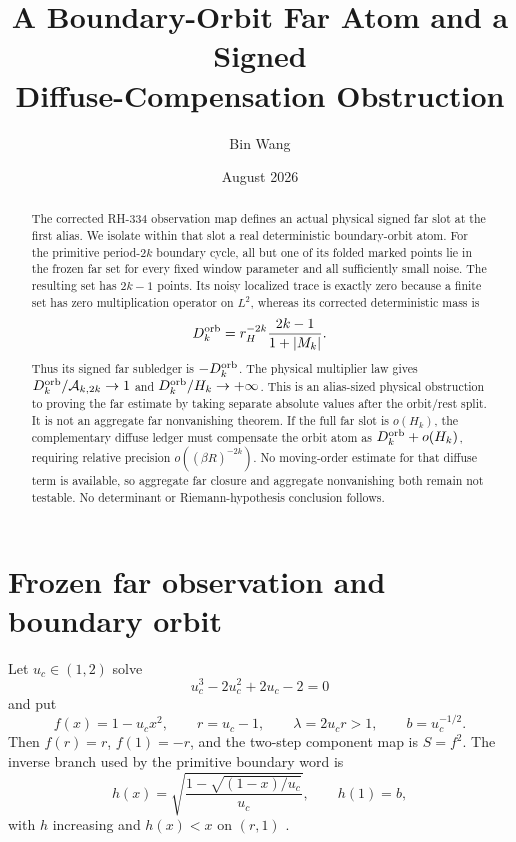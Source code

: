 \documentclass[11pt]{article}
\title{A Boundary-Orbit Far Atom and a Signed\\
Diffuse-Compensation Obstruction}
\author{Bin Wang}
\date{August 2026}
\theoremstyle{remark}
\begin{document}
\maketitle

\begin{abstract}
The corrected RH-334 observation map defines an actual physical signed far
slot at the first alias.  We isolate within that slot a real deterministic
boundary-orbit atom.  For the primitive period-$2k$ boundary cycle, all but
one of its folded marked points lie in the frozen far set for every fixed
window parameter and all sufficiently small noise.  The resulting set has
$2k-1$ points.  Its noisy localized trace is exactly zero because a finite
set has zero multiplication operator on $L^2$, whereas its corrected
deterministic mass is
\[
 D_k^{\rm orb}=r_H^{-2k}\frac{2k-1}{1+|M_k|}.
\]
Thus its signed far subledger is $-D_k^{\rm orb}$.  The physical multiplier
law gives $D_k^{\rm orb}/\mathcal A_{k,2k}\to1$ and
$D_k^{\rm orb}/H_k\to+\infty$.  This is an alias-sized physical obstruction
to proving the far estimate by taking separate absolute values after the
orbit/rest split.  It is not an aggregate far nonvanishing theorem.  If the
full far slot is $o(H_k)$, the complementary diffuse ledger must compensate
the orbit atom as $D_k^{\rm orb}+o(H_k)$, requiring relative precision
$o((\beta R)^{-2k})$.  No moving-order estimate for that diffuse term is
available, so aggregate far closure and aggregate nonvanishing both remain
not testable.  No determinant or Riemann-hypothesis conclusion follows.
\end{abstract}

\section{Frozen far observation and boundary orbit}

Let $u_c\in(1,2)$ solve
\begin{equation}\label{eq:u-cubic}
 u_c^3-2u_c^2+2u_c-2=0
\end{equation}
and put
\begin{equation}\label{eq:physical-constants}
 f(x)=1-u_cx^2,
 \qquad r=u_c-1,
 \qquad \lambda=2u_cr>1,
 \qquad b=u_c^{-1/2}.
\end{equation}
Then $f(r)=r$, $f(1)=-r$, and the two-step component map is $S=f^2$.
The inverse branch used by the primitive boundary word is
\begin{equation}\label{eq:h}
 h(x)=\sqrt{\frac{1-\sqrt{(1-x)/u_c}}{u_c}},
 \qquad h(1)=b,
\end{equation}
with $h$ increasing and $h(x)<x$ on $(r,1)$
\citep{WangBoundaryMonodromy2026}.
\end{document}

